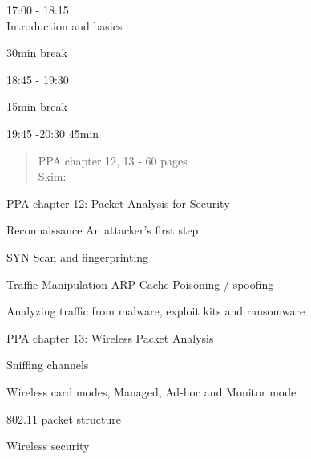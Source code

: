 \documentclass[Screen16to9,17pt]{foils}
\begin{document}

\begin{list2}
\item 17:00 - 18:15\\
Introduction and basics
\item 30min break\\

\item 18:45 - 19:30\\

\item 15min break\\

\item 19:45 -20:30 45min\\
\end{list2}



\begin{quote}
PPA chapter 12, 13 - 60 pages\\
Skim:\\
\end{quote}



\begin{alltt}\footnotesize

\end{alltt}

\begin{list1}
\item PPA chapter 12: Packet Analysis for Security
\begin{list2}
\item Reconnaissance An attacker’s first step
\item SYN Scan and fingerprinting
\item Traffic Manipulation ARP Cache Poisoning / spoofing
\item  Analyzing traffic from malware, exploit kits and ransomware
\end{list2}
\end{list1}



\begin{alltt}\footnotesize

\end{alltt}

\begin{list1}
\item PPA chapter 13: Wireless Packet Analysis
\begin{list2}
\item Sniffing channels
\item Wireless card modes, Managed, Ad-hoc and Monitor mode
\item 802.11 packet structure
\item Wireless security
\end{list2}
\end{list1}
\end{document}
